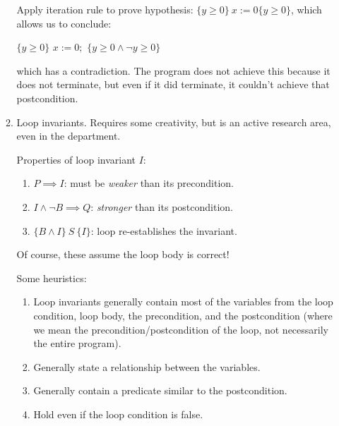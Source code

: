 \documentclass[11pt]{article}
\begin{document}
\begin{enumerate}
\begin{enumerate}
   Apply iteration rule to prove hypothesis: $\{y \geq 0 \} ~x := 0 \{ y \geq 0 \}$, which allows us to conclude:

\begin{algorithmic}[0]
\State $\{y \geq 0\}$
  \State $x := 0;$
\EndWhile
\State $\{y \geq 0 \land \neg y \geq 0\}$
\end{algorithmic}

which has a contradiction. The program does not achieve this because it does not terminate, but even if it did terminate, it couldn't achieve that postcondition.

 \item Loop invariants. Requires some creativity, but is an active research area, even in the department.

  Properties of loop invariant $I$:

  \begin{enumerate}

    \item $P \implies I$: must be \emph{weaker} than its precondition.

    \item  $I \land \neg B \implies Q$: \emph{stronger} than its postcondition.

    \item $\{B \land I\} ~S~ \{I\}$: loop re-establishes the invariant.

\end{enumerate}

 Of course, these assume the loop body is correct!


  Some heuristics:

  \begin{enumerate}

    \item Loop invariants generally contain most of the variables from the loop condition, loop body, the precondition, and the postcondition (where we mean the precondition/postcondition of the loop, not necessarily the entire program).

    \item Generally state a relationship between the variables.

    \item Generally contain a predicate similar to the postcondition.

    \item Hold even if the loop condition is false.

  \end{enumerate}


\end{enumerate}
\end{enumerate}
\end{document}
